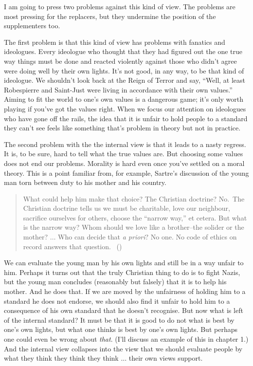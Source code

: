 \documentclass[
  10pt,
  letterpaper,
  twoside]{scrbook}
\begin{document}
I am going to press two problems against this kind of view. The problems
are most pressing for the replacers, but they undermine the position of
the supplementers too.

The first problem is that this kind of view has problems with fanatics
and ideologues. Every ideologue who thought that they had figured out
the one true way things must be done and reacted violently against those
who didn't agree were doing well by their own lights. It's not good, in
any way, to be that kind of ideologue. We shouldn't look back at the
Reign of Terror and say, ``Well, at least {Robespierre} and {Saint-Just}
were living in accordance with their own values.'' Aiming to fit the
world to one's own values is a dangerous game; it's only worth playing
if you've got the values right. When we focus our attention on
ideologues who have gone off the rails, the idea that it is unfair to
hold people to a standard they can't see feels like something that's
problem in theory but not in practice.

The second problem with the the internal view is that it leads to a
nasty regress. It is, to be sure, hard to tell what the true values are.
But choosing some values does not end our problems. Morality is hard
even once you've settled on a moral theory. This is a point familiar
from, for example, Sartre's discussion of the young man torn between
duty to his mother and his country.

\begin{quote}
What could help him make that choice? The Christian doctrine? No.~The
Christian doctrine tells us we must be charitable, love our neighbour,
sacrifice ourselves for others, choose the ``narrow way,'' et cetera.
But what is the narrow way? Whom should we love like a brother--the
solider or the mother? \(\dots\) Who can decide that \emph{a priori}? No
one. No code of ethics on record answers that question.
~()
\end{quote}

We can evaluate the young man by his own lights and still be in a way
unfair to him. Perhaps it turns out that the truly Christian thing to do
is to fight Nazis, but the young man concludes (reasonably but falsely)
that it is to help his mother. And he does that. If we are moved by the
unfairness of holding him to a standard he does not endorse, we should
also find it unfair to hold him to a consequence of his own standard
that he doesn't recognise. But now what is left of the internal
standard? It must be that it is good to do not what is best by one's own
lights, but what one thinks is best by one's own lights. But perhaps one
could even be wrong about \emph{that}. (I'll discuss an example of this
in chapter 1.) And the internal view collapses into the view that we
should evaluate people by what they think they think they think
\(\dots\) their own views support.
\end{document}
